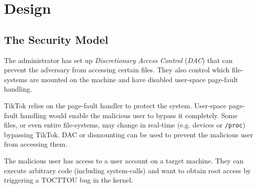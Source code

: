 \section{Design}
\label{sec:design}

\subsection{The Security Model}
\label{subsec:secmodel}

The administrator has set up \emph{Discretionary Access Control} (\emph{DAC})
that can prevent the adversary from accessing certain files. They also control
which file-systems are mounted on the machine and have disabled user-space
page-fault handling. 

TikTok relies on the page-fault handler to protect the system. User-space
page-fault handling would enable the malicious user to bypass it completely.
Some files, or even entire file-systems, may change in real-time (e.g. devices
or \texttt{/proc}) bypassing TikTok. DAC or dismounting can be used to prevent
the malicious user from accessing them.

The malicious user has access to a user account on a target machine. They can
execute arbitrary code (including system-calls) and want to obtain root access
by triggering a TOCTTOU bug in the kernel.


